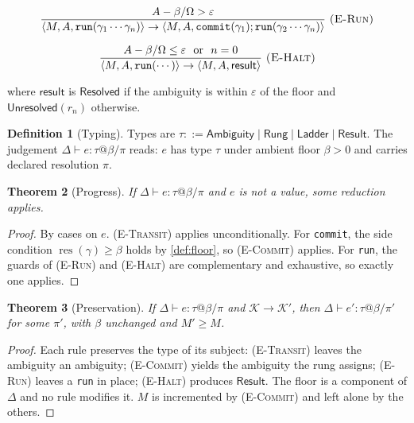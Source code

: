 \documentclass[11pt,a4paper]{article}
\theoremstyle{plain}
\newtheorem{theorem}{Theorem}[section]
\theoremstyle{definition}
\newtheorem{definition}[theorem]{Definition}
\theoremstyle{remark}
\newcommand{\res}{\operatorname{res}}
\newcommand{\flo}{\beta}
\newcommand{\pow}{\pi}
\newcommand{\gap}{r}
\newcommand{\Tot}{\Omega}
\newcommand{\Rung}{\gamma}
\newcommand{\Conf}{\mathcal{K}}
\newcommand{\Amb}{A}
\begin{document}
\[
\frac{\Amb - \flo/\Tot > \varepsilon}
     {\langle M, \Amb, \texttt{run}(\Rung_1\cdots\Rung_n)\rangle \to
      \langle M, \Amb, \texttt{commit}(\Rung_1);
              \texttt{run}(\Rung_2\cdots\Rung_n)\rangle}
\ \textsc{(E-Run)}
\]

\[
\frac{\Amb - \flo/\Tot \leq \varepsilon \ \text{ or }\ n = 0}
     {\langle M, \Amb, \texttt{run}(\cdots)\rangle \to
      \langle M, \Amb, \textsf{result}\rangle}
\ \textsc{(E-Halt)}
\]

where $\textsf{result}$ is $\textsf{Resolved}$ if the ambiguity is within
$\varepsilon$ of the floor and $\textsf{Unresolved}(\gap_n)$ otherwise.

\begin{definition}[Typing]
\label{def:typing}
Types are $\tau ::= \textsf{Ambiguity} \mid \textsf{Rung} \mid \textsf{Ladder}
\mid \textsf{Result}$. The judgement $\Delta \vdash e : \tau @ \flo / \pow$
reads: $e$ has type $\tau$ under ambient floor $\flo > 0$ and carries declared
resolution $\pow$.
\end{definition}

\begin{theorem}[Progress]
\label{thm:progress}
If $\Delta \vdash e : \tau @ \flo / \pow$ and $e$ is not a value, some reduction
applies.
\end{theorem}

\begin{proof}
By cases on $e$. \textsc{(E-Transit)} applies unconditionally. For
\texttt{commit}, the side condition $\res(\Rung) \ge \flo$ holds by
\cref{def:floor}, so \textsc{(E-Commit)} applies. For \texttt{run}, the guards of
\textsc{(E-Run)} and \textsc{(E-Halt)} are complementary and exhaustive, so
exactly one applies.
\end{proof}

\begin{theorem}[Preservation]
\label{thm:preservation}
If $\Delta \vdash e : \tau @ \flo / \pow$ and $\Conf \to \Conf'$, then
$\Delta \vdash e' : \tau @ \flo / \pow'$ for some $\pow'$, with $\flo$ unchanged
and $M' \ge M$.
\end{theorem}

\begin{proof}
Each rule preserves the type of its subject: \textsc{(E-Transit)} leaves the
ambiguity an ambiguity; \textsc{(E-Commit)} yields the ambiguity the rung
assigns; \textsc{(E-Run)} leaves a \texttt{run} in place; \textsc{(E-Halt)}
produces $\textsf{Result}$. The floor is a component of $\Delta$ and no rule
modifies it. $M$ is incremented by \textsc{(E-Commit)} and left alone by the
others.
\end{proof}
\end{document}
